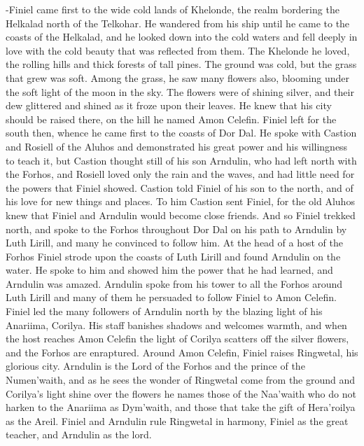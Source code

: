 \documentclass[smalldemyvopaper,11pt,twoside,onecolumn,openright,extrafontsizes]{memoir}
\begin{document}
-Finiel came first to the wide cold lands of Khelonde, the realm bordering the Helkalad north of the Telkohar. He wandered from his ship until he came to the coasts of the Helkalad, and he looked down into the cold waters and fell deeply in love with the cold beauty that was reflected from them. The Khelonde he loved, the rolling hills and thick forests of tall pines. The ground was cold, but the grass that grew was soft. Among the grass, he saw many flowers also, blooming under the soft light of the moon in the sky. The flowers were of shining silver, and their dew glittered and shined as it froze upon their leaves. He knew that his city should be raised there, on the hill he named Amon Celefin. Finiel left for the south then, whence he came first to the coasts of Dor Dal. He spoke with Castion and Rosiell of the Aluhos and demonstrated his great power and his willingness to teach it, but Castion thought still of his son Arndulin, who had left north with the Forhos, and Rosiell loved only the rain and the waves, and had little need for the powers that Finiel showed. Castion told Finiel of his son to the north, and of his love for new things and places. To him Castion sent Finiel, for the old Aluhos knew that Finiel and Arndulin would become close friends. And so Finiel trekked north, and spoke to the Forhos throughout Dor Dal on his path to Arndulin by Luth Lirill, and many he convinced to follow him. At the head of a host of the Forhos Finiel strode upon the coasts of Luth Lirill and found Arndulin on the water. He spoke to him and showed him the power that he had learned, and Arndulin was amazed. Arndulin spoke from his tower to all the Forhos around Luth Lirill and many of them he persuaded to follow Finiel to Amon Celefin. Finiel led the many followers of Arndulin north by the blazing light of his Anariima, Corilya. His staff banishes shadows and welcomes warmth, and when the host reaches Amon Celefin the light of Corilya scatters off the silver flowers, and the Forhos are enraptured. Around Amon Celefin, Finiel raises Ringwetal, his glorious city. Arndulin is the Lord of the Forhos and the prince of the Numen’waith, and as he sees the wonder of Ringwetal come from the ground and Corilya’s light shine over the flowers he names those of the Naa’waith who do not harken to the Anariima as Dym’waith, and those that take the gift of Hera’roilya as the Areil. Finiel and Arndulin rule Ringwetal in harmony, Finiel as the great teacher, and Arndulin as the lord.
\end{document}
